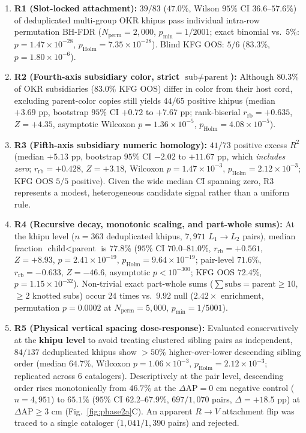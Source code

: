 \documentclass[11pt,a4paper]{article}
\begin{document}
\begin{enumerate}
  \item \textbf{R1 (Slot-locked attachment):} $39/83$ ($47.0\%$, Wilson $95\%$ CI $36.6\text{--}57.6\%$) of deduplicated multi-group OKR khipus pass individual intra-row permutation BH-FDR ($N_{\mathrm{perm}} = 2{,}000$, $p_{\min} = 1/2001$; exact binomial vs.\ $5\%$: $p = 1.47 \times 10^{-28}$, $p_{\mathrm{Holm}} = 7.35 \times 10^{-28}$). Blind KFG OOS: $5/6$ ($83.3\%$, $p = 1.80 \times 10^{-6}$).
  \item \textbf{R2 (Fourth-axis subsidiary color, strict $\text{sub} \neq \text{parent}$):} Although $80.3\%$ of OKR subsidiaries ($83.0\%$ KFG OOS) differ in color from their host cord, excluding parent-color copies still yields $44/65$ positive khipus (median $+3.69\text{ pp}$, bootstrap $95\%$ CI $+0.72$ to $+7.67\text{ pp}$; rank-biserial $r_{\mathrm{rb}} = +0.635$, $Z = +4.35$, asymptotic Wilcoxon $p = 1.36 \times 10^{-5}$, $p_{\mathrm{Holm}} = 4.08 \times 10^{-5}$).
  \item \textbf{R3 (Fifth-axis subsidiary numeric homology):} $41/73$ positive excess $R^2$ (median $+5.13\text{ pp}$, bootstrap $95\%$ CI $-2.02$ to $+11.67\text{ pp}$, which \emph{includes zero}; $r_{\mathrm{rb}} = +0.428$, $Z = +3.18$, Wilcoxon $p = 1.47 \times 10^{-3}$, $p_{\mathrm{Holm}} = 2.12 \times 10^{-3}$; KFG OOS $5/5$ positive). Given the wide median CI spanning zero, R3 represents a modest, heterogeneous candidate signal rather than a uniform rule.
  \item \textbf{R4 (Recursive decay, monotonic scaling, and part-whole sums):} At the khipu level ($n = 363$ deduplicated khipus, $7{,}971$ $L_1 \to L_2$ pairs), median fraction $\text{child} < \text{parent}$ is $77.8\%$ ($95\%$ CI $70.0\text{--}81.0\%$, $r_{\mathrm{rb}} = +0.561$, $Z = +8.93$, $p = 2.41 \times 10^{-19}$, $p_{\mathrm{Holm}} = 9.64 \times 10^{-19}$; pair-level $71.6\%$, $r_{\mathrm{rb}} = -0.633$, $Z = -46.6$, asymptotic $p < 10^{-300}$; KFG OOS $72.4\%$, $p = 1.15 \times 10^{-32}$). Non-trivial exact part-whole sums ($\sum \text{subs} = \text{parent} \ge 10$, $\ge 2$ knotted subs) occur $24$ times vs.\ $9.92$ null ($2.42\times$ enrichment, permutation $p = 0.0002$ at $N_{\mathrm{perm}} = 5{,}000$, $p_{\min} = 1/5001$).
  \item \textbf{R5 (Physical vertical spacing dose-response):} Evaluated conservatively at the \textbf{khipu level} to avoid treating clustered sibling pairs as independent, $84/137$ deduplicated khipus show $>50\%$ higher-over-lower descending sibling order (median $64.7\%$, Wilcoxon $p = 1.06 \times 10^{-3}$, $p_{\mathrm{Holm}} = 2.12 \times 10^{-3}$; replicated across $6$ catalogers). Descriptively at the pair level, descending order rises monotonically from $46.7\%$ at the $\Delta\text{AP} = 0\text{ cm}$ negative control ($n = 4{,}951$) to $65.1\%$ ($95\%$ CI $62.2\text{--}67.9\%$, $697/1{,}070$ pairs, $\Delta = +18.5\text{ pp}$) at $\Delta\text{AP} \ge 3\text{ cm}$ (Fig.~\ref{fig:phase2a}C). An apparent $R \to V$ attachment flip was traced to a single cataloger ($1{,}041/1{,}390$ pairs) and rejected.
\end{enumerate}
\end{document}
